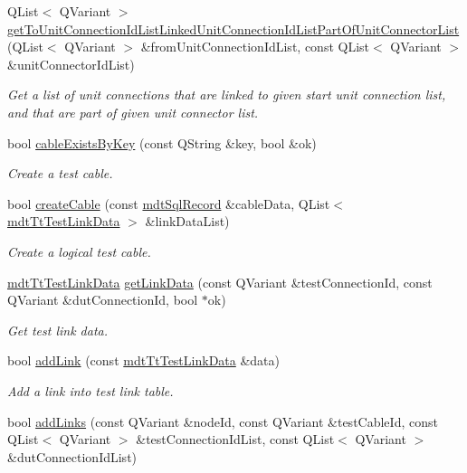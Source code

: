 \begin{DoxyCompactItemize}
Q\-List$<$ Q\-Variant $>$ \hyperlink{classmdt_tt_logical_test_cable_a650842c7b4daf810e0387b4119e714a1}{get\-To\-Unit\-Connection\-Id\-List\-Linked\-Unit\-Connection\-Id\-List\-Part\-Of\-Unit\-Connector\-List} (Q\-List$<$ Q\-Variant $>$ \&from\-Unit\-Connection\-Id\-List, const Q\-List$<$ Q\-Variant $>$ \&unit\-Connector\-Id\-List)
\begin{DoxyCompactList}\small\item\em Get a list of unit connections that are linked to given start unit connection list, and that are part of given unit connector list. \end{DoxyCompactList}\item 
bool \hyperlink{classmdt_tt_logical_test_cable_afff0da72bf307a9465728f260117134c}{cable\-Exists\-By\-Key} (const Q\-String \&key, bool \&ok)
\begin{DoxyCompactList}\small\item\em Create a test cable. \end{DoxyCompactList}\item 
bool \hyperlink{classmdt_tt_logical_test_cable_a94f09069ddc6f00fb80bc26ef3c501d6}{create\-Cable} (const \hyperlink{classmdt_sql_record}{mdt\-Sql\-Record} \&cable\-Data, Q\-List$<$ \hyperlink{classmdt_tt_test_link_data}{mdt\-Tt\-Test\-Link\-Data} $>$ \&link\-Data\-List)
\begin{DoxyCompactList}\small\item\em Create a logical test cable. \end{DoxyCompactList}\item 
\hyperlink{classmdt_tt_test_link_data}{mdt\-Tt\-Test\-Link\-Data} \hyperlink{classmdt_tt_logical_test_cable_a76c9af0e54d11f38ce1665b679a9ffd7}{get\-Link\-Data} (const Q\-Variant \&test\-Connection\-Id, const Q\-Variant \&dut\-Connection\-Id, bool $\ast$ok)
\begin{DoxyCompactList}\small\item\em Get test link data. \end{DoxyCompactList}\item 
bool \hyperlink{classmdt_tt_logical_test_cable_ab632b572837378da92a73350e95cc0ec}{add\-Link} (const \hyperlink{classmdt_tt_test_link_data}{mdt\-Tt\-Test\-Link\-Data} \&data)
\begin{DoxyCompactList}\small\item\em Add a link into test link table. \end{DoxyCompactList}\item 
bool \hyperlink{classmdt_tt_logical_test_cable_a3f0d93449a85ec52e0ae796eb3e7cb1d}{add\-Links} (const Q\-Variant \&node\-Id, const Q\-Variant \&test\-Cable\-Id, const Q\-List$<$ Q\-Variant $>$ \&test\-Connection\-Id\-List, const Q\-List$<$ Q\-Variant $>$ \&dut\-Connection\-Id\-List)

\end{DoxyCompactItemize}

